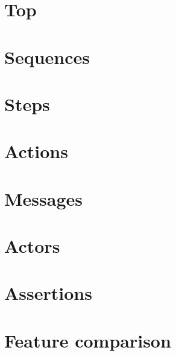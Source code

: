 \section{Top}\label{sec:metamodel-top}


\section{Sequences}\label{sec:metamodel-sequences}


\section{Steps}\label{sec:metamodel-steps}


\section{Actions}\label{sec:metamodel-actions}


\section{Messages}\label{sec:metamodel-messages}


\section{Actors}\label{sec:metamodel-actors}


\section{Assertions}\label{sec:metamodel-assertions}


\section{Feature comparison}\label{ssec:metamodel-features}


